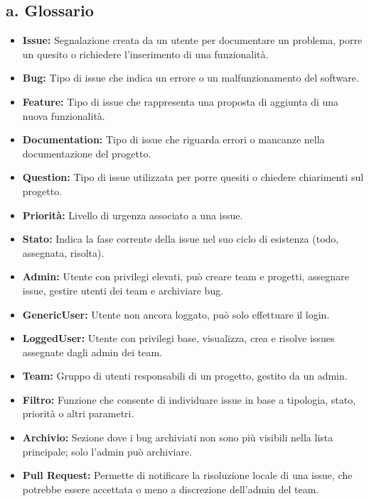 \documentclass[a4paper,12pt]{article}
\begin{document}
\subsection*{a. Glossario}
{}
\begin{tcolorbox}[
    enhanced,
    colback=BoxLight,
    colframe=UninaBlue,
    boxrule=0.8pt,
    arc=3pt,
    sharp corners,
    title=Glossario dei Termini,
    fonttitle=\bfseries\color{UninaBlue},
    coltitle=UninaBlue
]
\begin{itemize}[leftmargin=*]
\item \textbf{Issue:} Segnalazione creata da un utente per documentare un problema, porre un quesito o richiedere l'inserimento di una funzionalità. 
\item \textbf{Bug:} Tipo di issue che indica un errore o un malfunzionamento del software.
\item \textbf{Feature:} Tipo di issue che rappresenta una proposta di aggiunta di una nuova funzionalità.
\item \textbf{Documentation:} Tipo di issue che riguarda errori o mancanze nella documentazione del progetto.
\item \textbf{Question:} Tipo di issue utilizzata per porre quesiti o chiedere chiarimenti sul progetto.
\item \textbf{Priorità:} Livello di urgenza associato a una issue.
\item \textbf{Stato:} Indica la fase corrente della issue nel suo ciclo di esistenza (todo, assegnata, risolta).
\item \textbf{Admin:} Utente con privilegi elevati, può creare team e progetti, assegnare issue, gestire utenti dei team e archiviare bug.
\item \textbf{GenericUser:} Utente non ancora loggato, può solo effettuare il login.
\item \textbf{LoggedUser:} Utente con privilegi base, visualizza, crea e risolve issues assegnate dagli admin dei team.
\item \textbf{Team:} Gruppo di utenti responsabili di un progetto, gestito da un admin.
\item \textbf{Filtro:} Funzione che consente di individuare issue in base a tipologia, stato, priorità o altri parametri.
\item \textbf{Archivio:} Sezione dove i bug archiviati non sono più visibili nella lista principale; solo l'admin può archiviare.
\item \textbf{Pull Request:} Permette di notificare la risoluzione locale di una issue, che potrebbe essere accettata o meno a discrezione dell'admin del team.
\end{itemize}
\end{tcolorbox}
\end{document}

